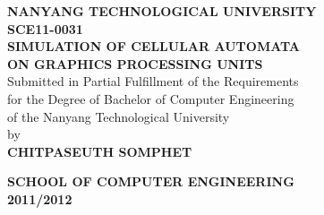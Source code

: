 \begin{titlepage}
\begin{center}

\uppercase{\textbf{\large NANYANG TECHNOLOGICAL UNIVERSITY}}
\\[6cm]

\uppercase{\textbf{SCE11-0031 \\Simulation of Cellular Automata \\on graphics processing units}}
\\[6cm]

Submitted in Partial Fulfillment of the Requirements\\
for the Degree of Bachelor of Computer Engineering\\
of the Nanyang Technological University
\\[0.8cm]

by
\\[0.8cm]

\uppercase{
\textbf{
CHITPASEUTH SOMPHET
}}

\vfill

\textsc{\bfseries SCHOOL OF COMPUTER ENGINEERING}
\\
\textbf{2011/2012}

\end{center}
\end{titlepage}